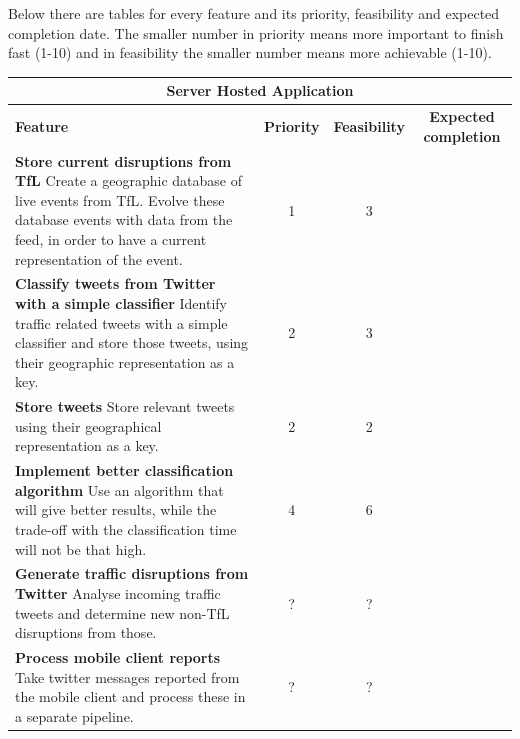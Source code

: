 Below there are tables for every feature and its priority, feasibility and expected completion date. The smaller number in priority means more important to finish fast (1-10) and in feasibility the smaller number means more achievable (1-10).

\begin{center}
\begin{tabular}{ | p{8cm} | c | c | c | }
\hline
\multicolumn{4}{|c|}{\textbf{Server Hosted Application}} \\ \hline
\textbf{Feature} & \textbf{Priority} & \textbf{Feasibility} & \textbf{Expected completion} \\ \hline
\textbf{Store current disruptions from TfL} \newline
Create a geographic database of live events from TfL. Evolve these database events with data from the feed, in order to have a current representation of the event. & 1 & 3 & \\ \hline
\textbf{Classify tweets from Twitter with a simple classifier} \newline
Identify traffic related tweets with a simple classifier and store those tweets, using their geographic representation as a key. & 2 & 3 & \\ \hline
\textbf{Store tweets} \newline
Store relevant tweets using their geographical representation as a key. & 2 & 2 & \\ \hline
\textbf{Implement better classification algorithm} \newline
Use an algorithm that will give better results, while the trade-off with the classification time will not be that high. & 4 & 6 & \\ \hline
\textbf{Generate traffic disruptions from Twitter} \newline
Analyse incoming traffic tweets and determine new non-TfL disruptions from those. & ? & ? & \\ \hline
\textbf{Process mobile client reports} \newline
Take twitter messages reported from the mobile client and process these in a separate pipeline. & ? & ? & \\ \hline
\end{tabular}
\end{center}

